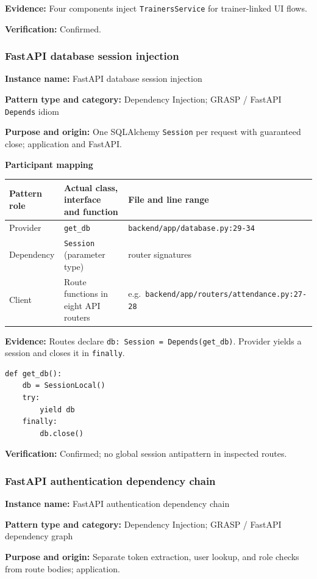 \documentclass[11pt,a4paper]{article}
\newcommand{\fp}[1]{\nolinkurl{#1}}
\newcommand{\filledentry}[2]{\textbf{#1:} #2\par}
\begin{document}
\filledentry{Evidence}{Four components inject \texttt{TrainersService} for trainer-linked UI flows.}
\filledentry{Verification}{Confirmed.}

\subsubsection{FastAPI database session injection}

\filledentry{Instance name}{FastAPI database session injection}
\filledentry{Pattern type and category}{Dependency Injection; GRASP / FastAPI \texttt{Depends} idiom}
\filledentry{Purpose and origin}{One SQLAlchemy \texttt{Session} per request with guaranteed close; application and FastAPI.}

\textbf{Participant mapping}\par
\begin{tabularx}{\linewidth}{@{}p{2.4cm}LL@{}}
\toprule
Pattern role & Actual class, interface and function & File and line range\\
\midrule
Provider & \texttt{get\_db} & \fp{backend/app/database.py:29-34}\\
Dependency & \texttt{Session} (parameter type) & router signatures\\
Client & Route functions in eight API routers & e.g.\ \fp{backend/app/routers/attendance.py:27-28}\\
\bottomrule
\end{tabularx}

\filledentry{Evidence}{Routes declare \texttt{db: Session = Depends(get\_db)}. Provider yields a session and closes it in \texttt{finally}.}
\begin{lstlisting}
def get_db():
    db = SessionLocal()
    try:
        yield db
    finally:
        db.close()
\end{lstlisting}
\filledentry{Verification}{Confirmed; no global session antipattern in inspected routes.}

\subsubsection{FastAPI authentication dependency chain}

\filledentry{Instance name}{FastAPI authentication dependency chain}
\filledentry{Pattern type and category}{Dependency Injection; GRASP / FastAPI dependency graph}
\filledentry{Purpose and origin}{Separate token extraction, user lookup, and role checks from route bodies; application.}
\end{document}
